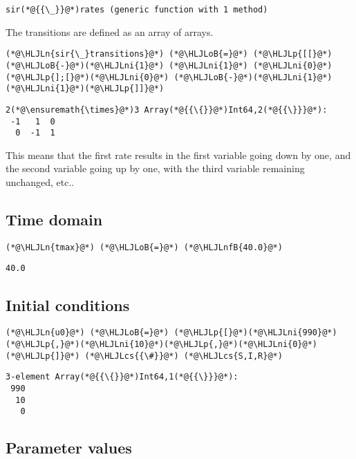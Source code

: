 \documentclass[12pt,a4paper]{article}
\newcommand{\HLJLn}[1]{#1}
\newcommand{\HLJLnfB}[1]{\textcolor[RGB]{59,151,46}{#1}}
\newcommand{\HLJLni}[1]{\textcolor[RGB]{59,151,46}{#1}}
\newcommand{\HLJLoB}[1]{\textcolor[RGB]{102,102,102}{\textbf{#1}}}
\newcommand{\HLJLp}[1]{#1}
\newcommand{\HLJLcs}[1]{\textcolor[RGB]{153,153,119}{\textit{#1}}}
\begin{document}
\begin{lstlisting}
sir(*@{{\_}}@*)rates (generic function with 1 method)
\end{lstlisting}


The transitions are defined as an array of arrays.


\begin{lstlisting}
(*@\HLJLn{sir{\_}transitions}@*) (*@\HLJLoB{=}@*) (*@\HLJLp{[[}@*)(*@\HLJLoB{-}@*)(*@\HLJLni{1}@*) (*@\HLJLni{1}@*) (*@\HLJLni{0}@*)(*@\HLJLp{];[}@*)(*@\HLJLni{0}@*) (*@\HLJLoB{-}@*)(*@\HLJLni{1}@*) (*@\HLJLni{1}@*)(*@\HLJLp{]]}@*)
\end{lstlisting}

\begin{lstlisting}
2(*@\ensuremath{\times}@*)3 Array(*@{{\{}}@*)Int64,2(*@{{\}}}@*):
 -1   1  0
  0  -1  1
\end{lstlisting}


This means that the first rate results in the first variable going down by one, and the second variable going up by one, with the third variable remaining unchanged, etc..

\subsection{Time domain}

\begin{lstlisting}
(*@\HLJLn{tmax}@*) (*@\HLJLoB{=}@*) (*@\HLJLnfB{40.0}@*)
\end{lstlisting}

\begin{lstlisting}
40.0
\end{lstlisting}


\subsection{Initial conditions}

\begin{lstlisting}
(*@\HLJLn{u0}@*) (*@\HLJLoB{=}@*) (*@\HLJLp{[}@*)(*@\HLJLni{990}@*)(*@\HLJLp{,}@*)(*@\HLJLni{10}@*)(*@\HLJLp{,}@*)(*@\HLJLni{0}@*)(*@\HLJLp{]}@*) (*@\HLJLcs{{\#}}@*) (*@\HLJLcs{S,I,R}@*)
\end{lstlisting}

\begin{lstlisting}
3-element Array(*@{{\{}}@*)Int64,1(*@{{\}}}@*):
 990
  10
   0
\end{lstlisting}


\subsection{Parameter values}
\end{document}
